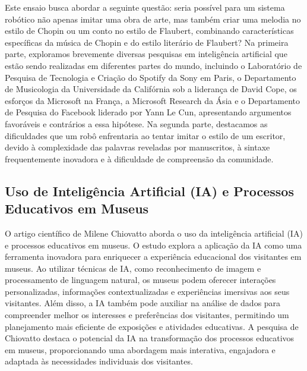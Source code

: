 \documentclass[12pt]{article}
\begin{document}
    Este ensaio busca abordar a seguinte questão: seria possível para um sistema robótico não apenas imitar uma obra de arte, mas também criar uma melodia no estilo de Chopin ou um conto no estilo de Flaubert, combinando características específicas da música de Chopin e do estilo literário de Flaubert? Na primeira parte, exploramos brevemente diversas pesquisas em inteligência artificial que estão sendo realizadas em diferentes partes do mundo, incluindo o Laboratório de Pesquisa de Tecnologia e Criação do Spotify da Sony em Paris, o Departamento de Musicologia da Universidade da Califórnia sob a liderança de David Cope, os esforços da Microsoft na França, a Microsoft Research da Ásia e o Departamento de Pesquisa do Facebook liderado por Yann Le Cun, apresentando argumentos favoráveis e contrários a essa hipótese. Na segunda parte, destacamos as dificuldades que um robô enfrentaria ao tentar imitar o estilo de um escritor, devido à complexidade das palavras reveladas por manuscritos, à sintaxe frequentemente inovadora e à dificuldade de compreensão da comunidade.


    \subsection{Uso de Inteligência Artificial (IA) e Processos Educativos em Museus}
	\label{sec:trab_relacionados}

    O artigo científico de Milene Chiovatto aborda o uso da inteligência artificial (IA) e processos educativos em museus. O estudo explora a aplicação da IA como uma ferramenta inovadora para enriquecer a experiência educacional dos visitantes em museus. Ao utilizar técnicas de IA, como reconhecimento de imagem e processamento de linguagem natural, os museus podem oferecer interações personalizadas, informações contextualizadas e experiências imersivas aos seus visitantes. Além disso, a IA também pode auxiliar na análise de dados para compreender melhor os interesses e preferências dos visitantes, permitindo um planejamento mais eficiente de exposições e atividades educativas. A pesquisa de Chiovatto destaca o potencial da IA na transformação dos processos educativos em museus, proporcionando uma abordagem mais interativa, engajadora e adaptada às necessidades individuais dos visitantes.
    
\end{document}
